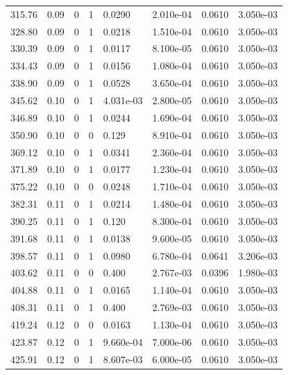 \documentclass[preview]{standalone}
\begin{document}
{{{\begin{tabular}{L{1.2cm}C{1.2cm} C{0.3cm}C{0.5cm} C{1.4cm}C{1.4cm} C{1.4cm}C{1.4cm}}
  315.76  &  0.09  & 0     &  1 &  0.0290  & 2.010e-04  & 0.0610 &  3.050e-03   \\ 
  328.80  &  0.09  & 0     &  1 &  0.0218  & 1.510e-04  & 0.0610 &  3.050e-03   \\ 
  330.39  &  0.09  & 0     &  1 &  0.0117  & 8.100e-05  & 0.0610 &  3.050e-03   \\ 
  334.43  &  0.09  & 0     &  1 &  0.0156  & 1.080e-04  & 0.0610 &  3.050e-03   \\ 
  338.90  &  0.09  & 0     &  1 &  0.0528  & 3.650e-04  & 0.0610 &  3.050e-03   \\ 
  345.62  &  0.10  & 0     &  1 &  4.031e-03  & 2.800e-05  & 0.0610 &  3.050e-03   \\ 
  346.89  &  0.10  & 0     &  1 &  0.0244  & 1.690e-04  & 0.0610 &  3.050e-03   \\ 
  350.90  &  0.10  & 0     &  0 &  0.129  & 8.910e-04  & 0.0610 &  3.050e-03   \\ 
  369.12  &  0.10  & 0     &  1 &  0.0341  & 2.360e-04  & 0.0610 &  3.050e-03   \\ 
  371.89  &  0.10  & 0     &  1 &  0.0177  & 1.230e-04  & 0.0610 &  3.050e-03   \\ 
  375.22  &  0.10  & 0     &  0 &  0.0248  & 1.710e-04  & 0.0610 &  3.050e-03   \\ 
  382.31  &  0.11  & 0     &  1 &  0.0214  & 1.480e-04  & 0.0610 &  3.050e-03   \\ 
  390.25  &  0.11  & 0     &  1 &  0.120  & 8.300e-04  & 0.0610 &  3.050e-03   \\ 
  391.68  &  0.11  & 0     &  1 &  0.0138  & 9.600e-05  & 0.0610 &  3.050e-03   \\ 
  398.57  &  0.11  & 0     &  1 &  0.0980  & 6.780e-04  & 0.0641 &  3.206e-03   \\ 
  403.62  &  0.11  & 0     &  0 &  0.400  & 2.767e-03  & 0.0396 &  1.980e-03   \\ 
  404.88  &  0.11  & 0     &  1 &  0.0165  & 1.140e-04  & 0.0610 &  3.050e-03   \\ 
  408.31  &  0.11  & 0     &  1 &  0.400  & 2.769e-03  & 0.0610 &  3.050e-03   \\ 
  419.24  &  0.12  & 0     &  0 &  0.0163  & 1.130e-04  & 0.0610 &  3.050e-03   \\ 
  423.87  &  0.12  & 0     &  1 &  9.660e-04  & 7.000e-06  & 0.0610 &  3.050e-03   \\ 
  425.91  &  0.12  & 0     &  1 &  8.607e-03  & 6.000e-05  & 0.0610 &  3.050e-03   \\ 

\end{tabular}}}}
\end{document}

